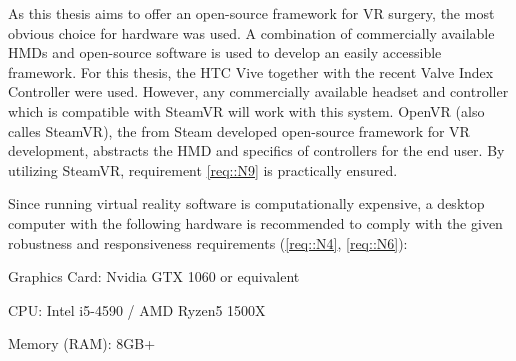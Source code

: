 As this thesis aims to offer an open-source framework for VR surgery, the most obvious choice for hardware was used.
A combination of commercially available HMDs and open-source software is used to develop an easily accessible framework.
For this thesis, the HTC Vive \cite{Vive} together with the recent Valve Index Controller \cite{ValveIndex} were used.
However, any commercially available headset and controller which is compatible with SteamVR will work with this system.
OpenVR \cite{OpenVR} (also calles SteamVR), the from Steam developed open-source framework for VR development, abstracts the HMD and specifics of controllers for the end user.
By utilizing SteamVR, requirement \ref{req::N9} is practically ensured.

Since running virtual reality software is computationally expensive, a desktop computer with the following hardware is recommended to comply with the given robustness and responsiveness requirements (\ref{req::N4}, \ref{req::N6}):

\begin{compactenum}[label=(\alph*)]
    \item Graphics Card: Nvidia GTX 1060 or equivalent
    \item CPU: Intel i5-4590 / AMD Ryzen5 1500X
    \item Memory (RAM): 8GB+
\end{compactenum}

